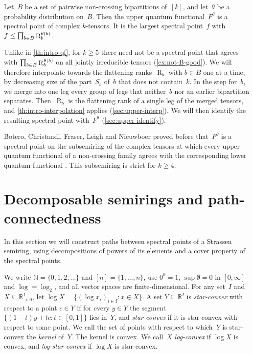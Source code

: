 \documentclass[11pt,letterpaper]{article}
\DeclareMathOperator{\tensorrank}{R}
\newcommand{\RR}{\mathbb{R}}
\newcommand{\NN}{\mathbb{N}}
\begin{document}
\begin{theorem}\label{th:intro-noncrossing}
Let~\(B\) be a set of pairwise non-crossing bipartitions of~\([k]\), and let~\(\theta\) be a probability distribution on~\(B\). Then the upper quantum functional~\(F^\theta\) is a spectral point of complex \(k\)-tensors. It is the largest spectral point~\(f\) with \(f\leq\prod_{b\in B}\tensorrank_b^{\smash{\theta(b)}}\).
\end{theorem}

Unlike in \cref{th:intro-qf}, for \(k\geq5\) there need not be a spectral point that agrees with \(\prod_{b\in B}\tensorrank_b^{\smash{\theta(b)}}\) on all jointly irreducible tensors (\cref{ex:not-B-good}). We will therefore interpolate towards the flattening ranks~\(\tensorrank_b\) with \(b\in B\) one at a time, by decreasing size of the part~\(S_b\) of~\(b\) that does not contain~\(k\). In the step for~\(b\), we merge into one leg every group of legs that neither~\(b\) nor an earlier bipartition separates. Then~\(\tensorrank_b\) is the flattening rank of a single leg of the merged tensors, and \cref{th:intro-interpolation} applies (\cref{sec:upper-interp}). We will then identify the resulting spectral point with~\(F^\theta\) (\cref{sec:upper-identify}).

Botero, Christandl, Fraser, Leigh and Nieuwboer \cite[Proposition~4.2 and Theorem~3.1]{botero2026quantumfunctionalshigherordertensors} proved before that~\(F^\theta\) is a spectral point on the subsemiring of the complex tensors at which every upper quantum functional of a non-crossing family agrees with the corresponding lower quantum functional \cite[Definition~3.3]{MR4495838}. This subsemiring is strict for \(k\geq4\).

\section{Decomposable semirings and path-connectedness}\label{sec:dec}

In this section we will construct paths between spectral points of a Strassen semiring, using decompositions of powers of its elements and a cover property of the spectral points.

We write $\NN = \{0, 1, 2, \ldots\}$ and $[n] = \{1, \ldots, n\}$, use $0^0 = 1$, $\sup \emptyset = 0$ in $[0, \infty]$ and $\log = \log_2$, and all vector spaces are finite-dimensional. For any set~$I$ and $X \subseteq \RR_{>0}^I$, let $\log X = \{(\log x_i)_{i \in I} : x \in X\}$. A set $Y \subseteq \RR^I$ is \emph{star-convex} with respect to a point $c \in Y$ if for every $y \in Y$ the segment $\{(1-t)y + tc : t \in [0,1]\}$ lies in~$Y$, and \emph{star-convex} if it is star-convex with respect to some point. We call the set of points with respect to which~$Y$ is star-convex the \emph{kernel} of~$Y$. The kernel is convex. We call~$X$ \emph{log-convex} if $\log X$ is convex, and \emph{log-star-convex} if $\log X$ is star-convex.
\end{document}
